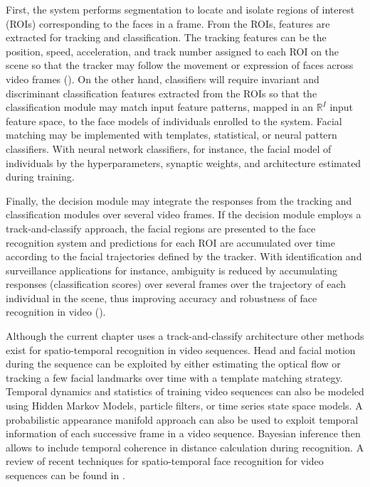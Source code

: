 First, the system performs segmentation to locate and isolate regions of interest (ROIs) corresponding to the faces in a frame.
From the ROIs, features are extracted for tracking and classification.
The tracking features can be the position, speed, acceleration, and track number assigned to each ROI on the scene so that the tracker may follow the movement or expression of faces across video frames (\cite{granger01}).
On the other hand, classifiers will require invariant and discriminant classification features extracted from the ROIs so that the classification module may match input feature patterns, mapped in an $\mathbb{R}^I$ input feature space, to the face models of individuals enrolled to the system.
Facial matching may be implemented with templates, statistical, or neural pattern classifiers.
With neural network classifiers, for instance, the facial model of individuals by the hyperparameters, synaptic weights, and architecture estimated during training.

Finally, the decision module may integrate the responses from the tracking and classification modules over several video frames.
If the decision module employs a track-and-classify approach, the facial regions are presented to the face recognition system and predictions for each ROI are accumulated over time according to the facial trajectories defined by the tracker.
With identification and surveillance applications for instance, ambiguity is reduced by accumulating responses (classification scores) over several frames over the trajectory of each individual in the scene, thus improving accuracy and robustness of face recognition in video (\cite{barry07}).

Although the current chapter uses a track-and-classify architecture other methods exist for spatio-temporal recognition in video sequences.
Head and facial motion during the sequence can be exploited by either estimating the optical flow or tracking a few facial landmarks over time with a template matching strategy.
Temporal dynamics and statistics of training video sequences can also be modeled using Hidden Markov Models, particle filters, or time series state space models.
A probabilistic appearance manifold approach can also be used to exploit temporal information of each successive frame in a video sequence.
Bayesian inference then allows to include temporal coherence in distance calculation during recognition.
A review of recent techniques for spatio-temporal face recognition for video sequences can be found in \cite{matta09}.

